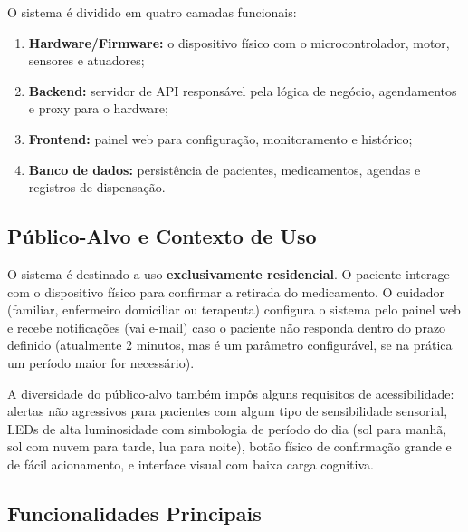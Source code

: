 \documentclass[12pt,a4paper]{article}
\begin{document}
O sistema é dividido em quatro camadas funcionais:

\begin{enumerate}
    \item \textbf{Hardware/Firmware:} o dispositivo físico com o microcontrolador, motor, sensores e atuadores;
    \item \textbf{Backend:} servidor de API responsável pela lógica de negócio, agendamentos e proxy para o hardware;
    \item \textbf{Frontend:} painel web para configuração, monitoramento e histórico;
    \item \textbf{Banco de dados:} persistência de pacientes, medicamentos, agendas e registros de dispensação.
\end{enumerate}

\subsection{Público-Alvo e Contexto de Uso}

O sistema é destinado a uso \textbf{exclusivamente residencial}. O paciente interage com o dispositivo físico para confirmar a retirada do medicamento. O cuidador (familiar, enfermeiro domiciliar ou terapeuta) configura o sistema pelo painel web e recebe notificações (vai e-mail) caso o paciente não responda dentro do prazo definido (atualmente 2 minutos, mas é um parâmetro configurável, se na prática um período maior for necessário).

A diversidade do público-alvo também impôs alguns requisitos de acessibilidade: alertas não agressivos para pacientes com algum tipo de sensibilidade sensorial, LEDs de alta luminosidade com simbologia de período do dia (sol para manhã, sol com nuvem para tarde, lua para noite), botão físico de confirmação grande e de fácil acionamento, e interface visual com baixa carga cognitiva.

\subsection{Funcionalidades Principais}
\end{document}
